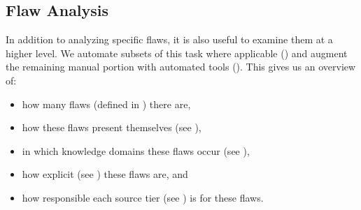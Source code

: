 \subsection{Flaw Analysis}\label{flaw-analysis}

In addition to analyzing specific flaws, it is also useful to examine them at
a higher level. We automate subsets of this task where applicable
() and augment the remaining manual portion with
automated tools (). This gives us an overview of:
\begin{itemize}
    \item how many flaws (defined in ) there are,
    \item how these flaws present themselves (see ),
    \item in which knowledge domains these flaws occur (see ),
    \item how explicit (see ) these flaws are, and
    \item how responsible each source tier (see ) is for
          these flaws.
\end{itemize}

